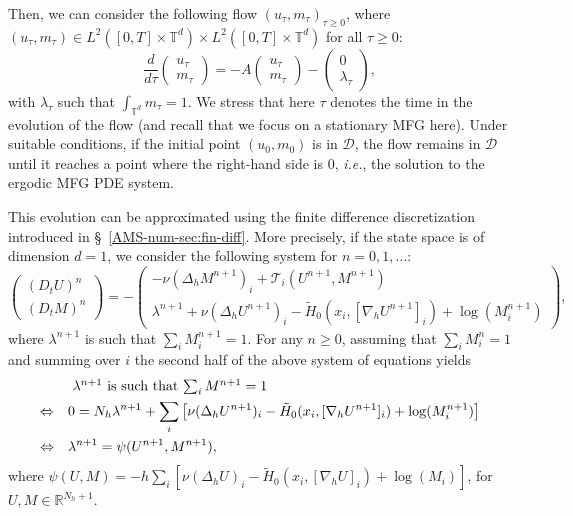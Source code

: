 \documentclass{amsproc}
\theoremstyle{definition}
\theoremstyle{remark}
\numberwithin{equation}{section}
\newcommand{\RR}{{\mathbb R}}
\newcommand{\TT}{{\mathbb T}}
\newcommand{\grad}{\nabla}
\begin{document}
Then, we can consider the following flow $(u_\tau, m_\tau)_{\tau \ge 0}$, where  $(u_\tau, m_\tau) \in L^2([0,T] \times \TT^d) \times L^2([0,T] \times \TT^d)$ for all $\tau \ge 0$:
$$
	\frac{d}{d \tau}
	\begin{pmatrix}
	u_\tau
	\\
	m_\tau
	\end{pmatrix} 
	=
	- A \begin{pmatrix}
	u_\tau
	\\
	m_\tau
	\end{pmatrix} - \begin{pmatrix}
	0
	\\
	\lambda_\tau
	\end{pmatrix} ,
$$
with $\lambda_\tau$ such that $\int_{\TT^d} m_\tau = 1$. We stress that here $\tau$ denotes the time in the evolution of the flow (and recall that we focus on a stationary MFG here). Under suitable conditions, if the initial point $(u_0, m_0)$ is in $\mathcal{D}$, the flow remains in $\mathcal{D}$ until it reaches a point where the right-hand side is $0$, \textit{i.e.}, the solution to the ergodic MFG PDE system.
 


This evolution can be approximated using the finite difference discretization introduced in \S~\ref{AMS-num-sec:fin-diff}. More precisely, if the state space is of dimension $d=1$, we consider the following system for $n=0,1,\dots$:
$$
	\begin{pmatrix}
	(D_t U)^n
	\\
	(D_t M)^n
	\end{pmatrix} 
	=
	- \begin{pmatrix}
	 -\nu (\Delta_h M^{n+1})_{i}
	+ \mathcal{T}_i(U^{n+1}, M^{n+1})
	\\
	\lambda^{n+1} + \nu (\Delta_h U^{n+1})_{i}
	- \tilde{H}_0(x_i, [\grad_h U^{n+1}]_i) 
	+ \log(M^{n+1}_i)
	\end{pmatrix},
$$
where $\lambda^{n+1}$ is such that $\sum_i M^{n+1}_i = 1$.  For any $n \ge 0$, assuming that $\sum_i M^{n}_i = 1$ and summing over $i$ the second half of the above system of equations yields
\begin{align*}
	& \hbox{ $\lambda^{n+1}$ is such that $\sum_i M^{n+1} = 1$} 
	\\
	\Leftrightarrow \quad
	&0 = N_h \lambda^{n+1} + \sum_{i}  \left[ \nu (\Delta_h U^{n+1})_{i}
	- \tilde{H}_0(x_i, [\grad_h U^{n+1}]_i) 
	+ \log(M^{n+1}_i) \right]
	\\
	\Leftrightarrow \quad 
	&\lambda^{n+1} = \psi(U^{n+1}, M^{n+1}),
\end{align*}
where $\psi(U, M) = - h \sum_{i}  \left[ \nu (\Delta_h U)_{i}
	- \tilde{H}_0(x_i, [\grad_h U]_i) 
	+ \log(M_i) \right]$, for $U, M \in \RR^{N_h+1}$.
	
\end{document}
